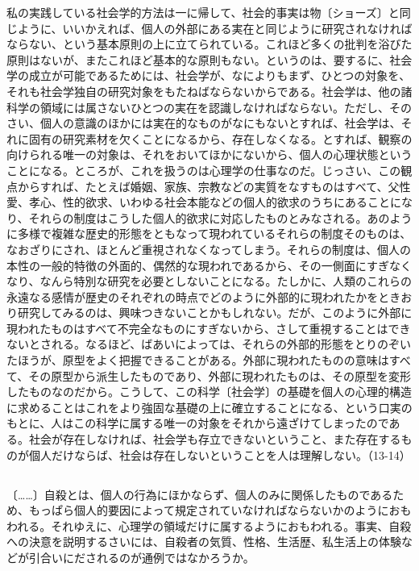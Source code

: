 私の実践している社会学的方法は一に帰して、社会的事実は物〔ショーズ〕と同じように、いいかえれば、個人の外部にある実在と同じように研究されなければならない、という基本原則の上に立てられている。これほど多くの批判を浴びた原則はないが、またこれほど基本的な原則もない。というのは、要するに、社会学の成立が可能であるためには、社会学が、なによりもまず、ひとつの対象を、それも社会学独自の研究対象をもたねばならないからである。社会学は、他の諸科学の領域には属さないひとつの実在を認識しなければならない。ただし、そのさい、個人の意識のほかには実在的なものがなにもないとすれば、社会学は、それに固有の研究素材を欠くことになるから、存在しなくなる。とすれば、観察の向けられる唯一の対象は、それをおいてほかにないから、個人の心理状態ということになる。ところが、これを扱うのは心理学の仕事なのだ。じっさい、この観点からすれば、たとえば婚姻、家族、宗教などの実質をなすものはすべて、父性愛、孝心、性的欲求、いわゆる社会本能などの個人的欲求のうちにあることになり、それらの制度はこうした個人的欲求に対応したものとみなされる。あのように多様で複雑な歴史的形態をともなって現われているそれらの制度そのものは、なおざりにされ、ほとんど重視されなくなってしまう。それらの制度は、個人の本性の一般的特徴の外面的、偶然的な現われであるから、その一側面にすぎなくなり、なんら特別な研究を必要としないことになる。たしかに、人類のこれらの永遠なる感情が歴史のそれぞれの時点でどのように外部的に現われたかをときおり研究してみるのは、興味つきないことかもしれない。だが、このように外部に現われたものはすべて不完全なものにすぎないから、さして重視することはできないとされる。なるほど、ばあいによっては、それらの外部的形態をとりのぞいたほうが、原型をよく把握できることがある。外部に現われたものの意味はすべて、その原型から派生したものであり、外部に現われたものは、その原型を変形したものなのだから。こうして、この科学〔社会学〕の基礎を個人の心理的構造に求めることはこれをより強固な基礎の上に確立することになる、という口実のもとに、人はこの科学に属する唯一の対象をそれから遠ざけてしまったのである。社会が存在しなければ、社会学も存立できないということ、また存在するものが個人だけならば、社会は存在しないということを人は理解しない。（13-14）

\subsection{}


〔……〕自殺とは、個人の行為にほかならず、個人のみに関係したものであるため、もっぱら個人的要因によって規定されていなければならないかのようにおもわれる。それゆえに、心理学の領域だけに属するようにおもわれる。事実、自殺への決意を説明するさいには、自殺者の気質、性格、生活歴、私生活上の体験などが引合いにだされるのが通例ではなかろうか。

